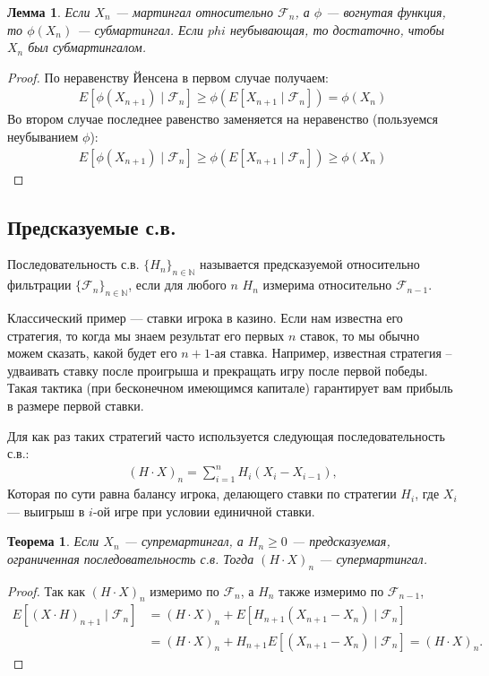 \documentclass[12pt]{article}
\newcommand\N{\mathbb{N}}
\newcommand\F{\mathcal{F}}
\newtheorem{theorem}{Теорема}
\newtheorem{lemma}{Лемма}
\begin{document}
\begin{lemma}\label{lem:convex}
  Если $X_n$ --- мартингал относительно $\F_n$, а $\phi$ --- вогнутая функция, то $\phi(X_n)$ --- субмартингал. Если $phi$ неубывающая, то достаточно, чтобы $X_n$ был субмартингалом.
\end{lemma}
\begin{proof}
  По неравенству Йенсена в первом случае получаем:
  \begin{align*}
    E[\phi(X_{n + 1}) \mid \F_n] \ge \phi(E[X_{n + 1} \mid \F_n]) = \phi(X_n)
  \end{align*}
  Во втором случае последнее равенство заменяется на неравенство (пользуемся неубыванием $\phi$):
  \begin{align*}
    E[\phi(X_{n + 1}) \mid \F_n] \ge \phi(E[X_{n + 1} \mid \F_n]) \ge \phi(X_n)
  \end{align*}
\end{proof}

\subsection{Предсказуемые с.в.}

Последовательность с.в. $\{H_n\}_{n \in \N}$ называется предсказуемой относительно фильтрации $\{\F_n\}_{n \in \N}$, если для любого $n$ $H_n$ измерима относительно $\F_{n - 1}$.

Классический пример --- ставки игрока в казино. Если нам известна его стратегия, то когда мы знаем результат его первых $n$ ставок, то мы обычно можем сказать, какой будет его $n + 1$-ая ставка. Например, известная стратегия -- удваивать ставку после проигрыша и прекращать игру после первой победы. Такая тактика (при бесконечном имеющимся капитале) гарантирует вам прибыль в размере первой ставки.

Для как раз таких стратегий часто используется следующая последовательность с.в.:
\begin{align*}
  (H \cdot X)_n = \sum_{i = 1}^n H_i (X_i - X_{i - 1}),
\end{align*}
Которая по сути равна балансу игрока, делающего ставки по стратегии $H_i$, где $X_i$ --- выигрыш в $i$-ой игре при условии единичной ставки.

\begin{theorem}
  Если $X_n$ --- супремартингал, а $H_n \ge 0$ --- предсказуемая, ограниченная последовательность с.в. Тогда $(H \cdot X)_n$ --- супермартингал.
\end{theorem}
\begin{proof}
  Так как $(H \cdot X)_n$ измеримо по $\F_n$, а $H_n$ также измеримо по $\F_{n - 1}$,
  \begin{align*}
    E[(X \cdot H)_{n + 1} \mid \F_n] &= (H \cdot X)_n + E[H_{n + 1}(X_{n + 1} - X_n) \mid \F_n] \\
    &= (H \cdot X)_n + H_{n + 1}E[(X_{n + 1} - X_n) \mid \F_n] = (H \cdot X)_n.
  \end{align*}
\end{proof}
\end{document}

